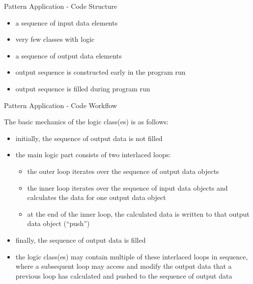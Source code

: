 \begin{frame}[fragile]{Pattern Application - Code Structure}

\begin{itemize}
\item a sequence of input data elements
\item very few classes with logic
\item a sequence of output data elements 
\item output sequence is constructed early in the program run
\item output sequence is filled during program run
\end{itemize}

\end{frame}

\begin{frame}[fragile]{Pattern Application - Code Workflow}

The basic mechanics of the logic class(es) is as follows:

\begin{itemize}
\item initially, the sequence of output data is not filled
\item the main logic part consists of two interlaced loops: 
\begin{itemize}
\item the outer loop iterates over the sequence of output data objects
\item the inner loop iterates over the sequence of input data objects and calculates the data for one output data object
\item at the end of the inner loop, the calculated data is written to that output data object (``push'')
\end{itemize}
\item finally, the sequence of output data is filled
\item the logic class(es) may contain multiple of these interlaced loops in sequence, where a subsequent loop may access and modify the output data that a previous loop has calculated and pushed to the sequence of output data
\end{itemize}

\end{frame}


